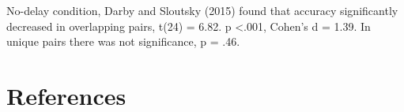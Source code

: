 \documentclass[
  english,
  man]{article}
\newlength{\cslhangindent}
\newlength{\cslentryspacingunit} %
\newenvironment{CSLReferences}[2] %
 {%
  \setlength{\parindent}{0pt}
  \ifodd #1
  \let\oldpar\par
  \def\par{\hangindent=\cslhangindent\oldpar}
  \fi
  \setlength{\parskip}{#2\cslentryspacingunit}
 }%
 {}
\begin{document}
No-delay condition, Darby and Sloutsky (2015) found that accuracy significantly decreased in overlapping pairs, t(24) = 6.82. p \textless.001, Cohen's d = 1.39. In unique pairs there was not significance, p = .46.

\newpage

\hypertarget{references}{%
\section{References}\label{references}}

\begingroup
\setlength{\parindent}{-0.5in}
\setlength{\leftskip}{0.5in}

\hypertarget{refs}{}
\begin{CSLReferences}{0}{0}
\end{CSLReferences}

\endgroup
\end{document}
